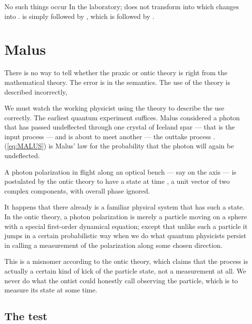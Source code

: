 \documentclass[a4paper,11pt]{article}
\begin{document}
No such things occur In the laboratory;
\coordHE{} does not transform into 
\coordHE{} which changes into \coordHE{}.
\coordHE{} is simply followed by \coordHE{},
which is followed by \coordHE{}.

\section{Malus}

There is no way 
to tell whether the praxic or ontic theory
is right  from the mathematical theory.
The error is in the semantics.
The use of the theory is described incorrectly,

We must watch the working physicist using the theory
to describe the use correctly.
The earliest quantum experiment suffices.
Malus \cite{MALUS} considered  a photon that has
passed undeflected  through one crystal of Iceland spar
--- that is
the input process \coordHE{} ---
and is about to meet another --- 
the outtake process  \coordHE{} .
(\ref{eq:MALUS}) is Malus' law
for the probability that the photon 
will again be undeflected.

A photon polarization in flight along an optical bench
--- say on the \coordHE{} axis --- is postulated
by the ontic theory to have a state
\coordHE{} at time \coordHE{},
a unit vector of two complex components,
with overall phase ignored.

It happens that there already is a familiar physical system 
that has such a state.
In the ontic theory, a photon polarization
is merely a particle moving on a sphere
with a special first-order dynamical equation;
except that unlike such a particle
it jumps in a certain probabilistic way
when 
we do what quantum physicists 
persist in calling
a measurement of the polarization
along some chosen direction.

This is a misnomer according to the ontic theory,
which claims that the process is actually a 
certain kind of kick of the particle state,
not a measurement at all.
We never do what the ontist
could honestly call observing the particle,
which is  to measure its state \myHighlight{$\psi$}\coordHE{}
at some time.


\subsection{The test}
\end{document}
